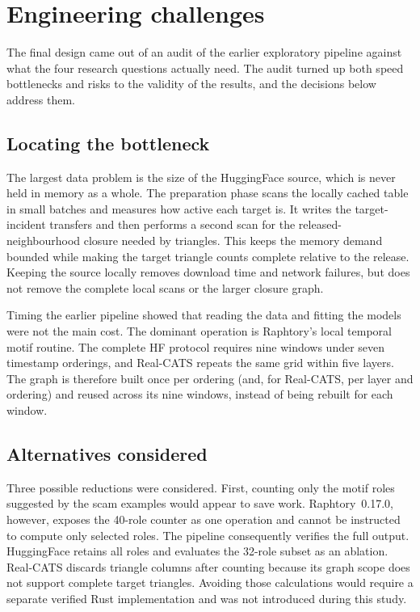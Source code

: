 \appendix


\chapter{Engineering challenges}
\label{app:engineering_challenges}

The final design came out of an audit of the earlier exploratory pipeline against
what the four research questions actually need. The audit turned up both speed
bottlenecks and risks to the validity of the results, and the decisions below
address them.

\section{Locating the bottleneck}

The largest data problem is the size of the HuggingFace source, which is never
held in memory as a whole. The preparation phase scans the locally cached table in
small batches and measures how active each target is. It writes the
target-incident transfers and then performs a second scan for the released-neighbourhood
closure needed by triangles. This keeps the memory demand bounded while making
the target triangle counts complete relative to the release. Keeping the source
locally removes download time and network failures, but does not remove the
complete local scans or the larger closure graph.

Timing the earlier pipeline showed that reading the data and fitting the models
were not the main cost. The dominant operation is Raphtory's local temporal motif
routine. The complete HF protocol requires nine windows under seven timestamp
orderings, and Real-CATS repeats the same grid within five layers. The graph is
therefore built once per ordering (and, for Real-CATS, per layer and ordering)
and reused across its nine windows, instead of being rebuilt for each window.

\section{Alternatives considered}

Three possible reductions were considered. First, counting only the motif roles
suggested by the scam examples would appear to save work. Raphtory~0.17.0,
however, exposes the 40-role counter as one operation and cannot be instructed to
compute only selected roles. The pipeline consequently verifies the full output.
HuggingFace retains all roles and evaluates the 32-role subset as an ablation.
Real-CATS discards triangle columns after counting because its graph scope does
not support complete target triangles. Avoiding those calculations would require
a separate verified Rust implementation and was not introduced during this study.

